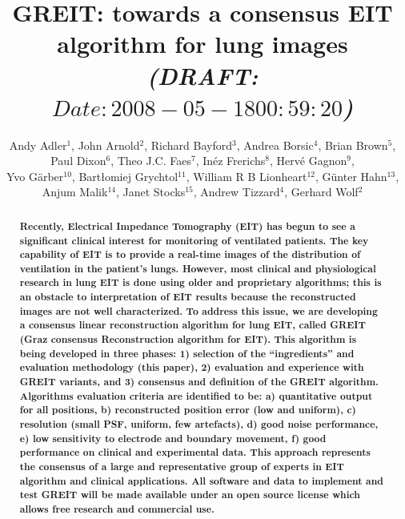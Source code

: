 \documentclass[letterpaper,twocolumn,10pt]{article}
\begin{document}
\title{\bf GREIT: towards a consensus EIT algorithm for lung images
\normalsize \em (DRAFT: $Date: 2008-05-18 00:59:20 $)%
}

\author{Andy Adler$^{1}$,
        John Arnold$^{2}$,
        Richard Bayford$^{3}$,
        Andrea Borsic$^{4}$,
        Brian Brown$^{5}$,
\\
        Paul Dixon$^{6}$,
        Theo J.C. Faes$^{7}$,
        In\'ez Frerichs$^{8}$,
        Herv\'e Gagnon$^{9}$,
\\
        Yvo G\"arber$^{10}$,
        Bart\l{}omiej Grychtol$^{11}$, 
        William R B Lionheart$^{12}$,
        G\"unter Hahn$^{13}$,
\\
        Anjum Malik$^{14}$,
        Janet Stocks$^{15}$,
        Andrew Tizzard$^{4}$,
        Gerhard Wolf$^{2}$
       }

\date{}
\maketitle

\begin{abstract}
\small \bf
Recently, Electrical Impedance Tomography (EIT) has begun to see a
significant clinical interest for monitoring of
ventilated patients.  The key capability of EIT is to
provide a real-time images of the distribution of ventilation in
the patient's lungs.
However, most clinical and physiological research in lung EIT
is done using older and proprietary algorithms; this is
an obstacle to interpretation of EIT results because the
reconstructed images are not well characterized.
To address this issue, we are developing a
consensus linear reconstruction algorithm for lung EIT,
called GREIT (Graz consensus Reconstruction algorithm for EIT).
This algorithm is being developed in three phases:
1) selection of the ``ingredients'' and evaluation 
methodology (this paper),
2) evaluation and experience with GREIT variants, and
3) consensus and definition of the GREIT algorithm.
Algorithms evaluation criteria are identified to be:
a) quantitative output for all positions,
b) reconstructed position error (low and uniform),
c) resolution (small PSF, uniform, few artefacts),
d) good noise performance,
e) low sensitivity to electrode and boundary movement,
f) good performance on clinical and experimental data.
This approach represents the consensus of a large and representative
group of experts in EIT algorithm and clinical applications.
All software and data to implement and test GREIT will be
made available under an open source license which allows free
research and commercial use.
\end{abstract}
\end{document}
